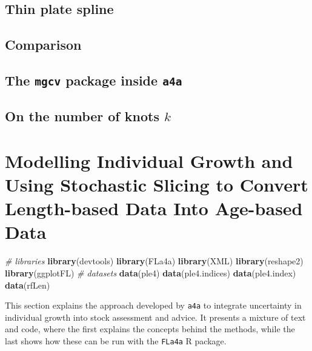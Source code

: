 \documentclass[
]{book}
\newenvironment{Shaded}{\begin{snugshade}}{\end{snugshade}}
\newcommand{\CommentTok}[1]{\textcolor[rgb]{0.56,0.35,0.01}{\textit{#1}}}
\newcommand{\FunctionTok}[1]{\textcolor[rgb]{0.13,0.29,0.53}{\textbf{#1}}}
\newcommand{\NormalTok}[1]{#1}
\begin{document}
\hypertarget{thin-plate-spline}{%
\section{Thin plate spline}\label{thin-plate-spline}}

\hypertarget{comparison}{%
\section{Comparison}\label{comparison}}

\hypertarget{the-mgcv-package-inside-a4a}{%
\section{\texorpdfstring{The \texttt{mgcv} package inside \texttt{a4a}}{The mgcv package inside a4a}}\label{the-mgcv-package-inside-a4a}}

\hypertarget{on-the-number-of-knots-k}{%
\section{\texorpdfstring{On the number of knots \(k\)}{On the number of knots k}}\label{on-the-number-of-knots-k}}

\hypertarget{modelling-individual-growth-and-using-stochastic-slicing-to-convert-length-based-data-into-age-based-data}{%
\chapter{Modelling Individual Growth and Using Stochastic Slicing to Convert Length-based Data Into Age-based Data}\label{modelling-individual-growth-and-using-stochastic-slicing-to-convert-length-based-data-into-age-based-data}}

\begin{Shaded}
\begin{Highlighting}[]
\CommentTok{\# libraries}
\FunctionTok{library}\NormalTok{(devtools)}
\FunctionTok{library}\NormalTok{(FLa4a)}
\FunctionTok{library}\NormalTok{(XML)}
\FunctionTok{library}\NormalTok{(reshape2)}
\FunctionTok{library}\NormalTok{(ggplotFL)}
\CommentTok{\# datasets}
\FunctionTok{data}\NormalTok{(ple4)}
\FunctionTok{data}\NormalTok{(ple4.indices)}
\FunctionTok{data}\NormalTok{(ple4.index)}
\FunctionTok{data}\NormalTok{(rfLen)}
\end{Highlighting}
\end{Shaded}

This section explains the approach developed by \texttt{a4a} to integrate uncertainty in individual growth into stock assessment and advice. It presents a mixture of text and code, where the first explains the concepts behind the methods, while the last shows how these can be run with the \texttt{FLa4a} R package.
\end{document}
